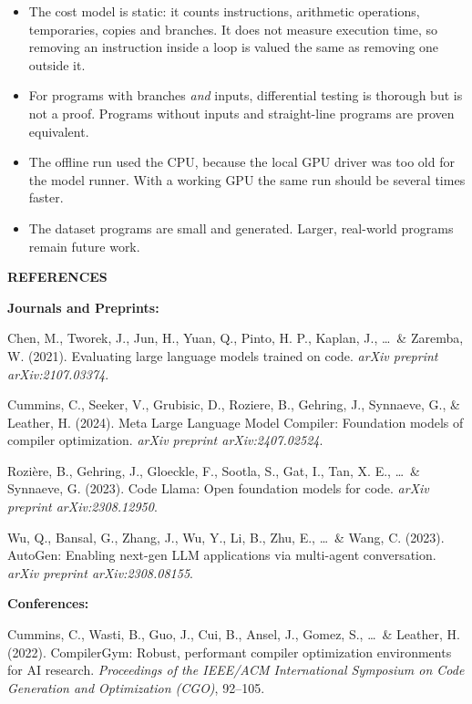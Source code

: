 \documentclass[12pt,a4paper]{report}
\newcommand{\apa}[1]{\par\hangindent=1.27cm\hangafter=1 #1\par}
\newcommand{\refgroup}[1]{\par\vspace{0.35cm}\noindent\textbf{#1}\par\vspace{0.1cm}}
\begin{document}
\begin{itemize}[leftmargin=2cm]
  \item The cost model is static: it counts instructions, arithmetic operations, temporaries, copies and branches. It does not measure execution time, so removing an instruction inside a loop is valued the same as removing one outside it.
  \item For programs with branches \emph{and} inputs, differential testing is thorough but is not a proof. Programs without inputs and straight-line programs are proven equivalent.
  \item The offline run used the CPU, because the local GPU driver was too old for the model runner. With a working GPU the same run should be several times faster.
  \item The dataset programs are small and generated. Larger, real-world programs remain future work.
\end{itemize}


\newpage
\begin{center}
{\fontsize{16}{20}\selectfont \textbf{REFERENCES}}
\end{center}
\vspace{0.3cm}

\refgroup{Journals and Preprints:}

\apa{Chen, M., Tworek, J., Jun, H., Yuan, Q., Pinto, H. P., Kaplan, J., \ldots\ \& Zaremba, W. (2021). Evaluating large language models trained on code. \textit{arXiv preprint arXiv:2107.03374}.}

\apa{Cummins, C., Seeker, V., Grubisic, D., Roziere, B., Gehring, J., Synnaeve, G., \& Leather, H. (2024). Meta Large Language Model Compiler: Foundation models of compiler optimization. \textit{arXiv preprint arXiv:2407.02524}.}

\apa{Rozi\`ere, B., Gehring, J., Gloeckle, F., Sootla, S., Gat, I., Tan, X. E., \ldots\ \& Synnaeve, G. (2023). Code Llama: Open foundation models for code. \textit{arXiv preprint arXiv:2308.12950}.}

\apa{Wu, Q., Bansal, G., Zhang, J., Wu, Y., Li, B., Zhu, E., \ldots\ \& Wang, C. (2023). AutoGen: Enabling next-gen LLM applications via multi-agent conversation. \textit{arXiv preprint arXiv:2308.08155}.}

\refgroup{Conferences:}

\apa{Cummins, C., Wasti, B., Guo, J., Cui, B., Ansel, J., Gomez, S., \ldots\ \& Leather, H. (2022). CompilerGym: Robust, performant compiler optimization environments for AI research. \textit{Proceedings of the IEEE/ACM International Symposium on Code Generation and Optimization (CGO)}, 92--105.}
\end{document}
